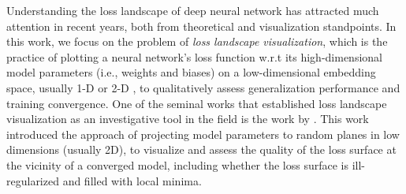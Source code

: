\documentclass[letterpaper]{article} %
\begin{document}
            Understanding the loss landscape of deep neural network has attracted much attention in recent years, both from theoretical and visualization standpoints. 
            In this work, we focus on the problem of \textit{loss landscape visualization}, which is the practice of plotting a neural network's loss function w.r.t its high-dimensional model parameters (i.e., weights and biases) on a low-dimensional embedding space, usually 1-D \cite{goodfellow2014qualitatively} or 2-D \cite{NIPS2018_7875}, to qualitatively assess generalization performance and training convergence. 
            One of the seminal works that established loss landscape visualization as an investigative tool in the field is the work by \cite{NIPS2018_7875}.
            This work introduced the approach of projecting model parameters to random planes in low dimensions (usually 2D), to visualize and assess the quality of the loss surface at the vicinity of a converged model, including  whether the loss surface is ill-regularized and filled with local minima. 
\end{document}
